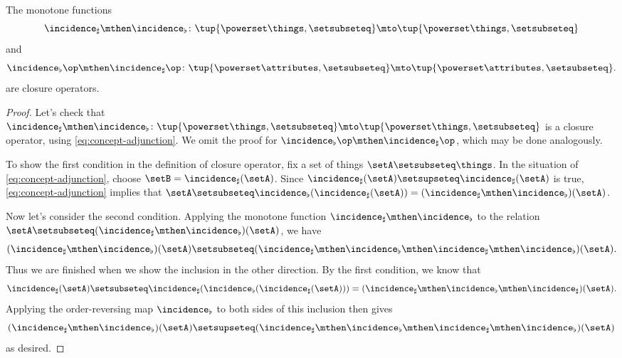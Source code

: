 \begin{lemma}\label{lem:cfa-closure-operators}
    The monotone functions
    \begin{equation}
        \incidence_\sharp \mthen \incidence_\flat \colon \tup{\powerset \things, \setsubseteq} \mto \tup{\powerset \things, \setsubseteq}
    \end{equation}
    and
    \begin{equation}
        \incidence_\flat\op \mthen \incidence_\sharp\op \colon \tup{\powerset \attributes, \setsubseteq} \mto \tup{\powerset \attributes, \setsubseteq}.
    \end{equation}
    are closure operators.
\end{lemma}

\begin{proof}
    Let's check that $\incidence_\sharp \mthen \incidence_\flat \colon \tup{\powerset \things, \setsubseteq} \mto \tup{\powerset \things, \setsubseteq}$ is a closure operator, using \cref{eq:concept-adjunction}.
    We omit the proof for $\incidence_\flat\op \mthen \incidence_\sharp\op$, which may be done analogously.

    To show the first condition in the definition of closure operator, fix a set of things $\setA \setsubseteq \things$.
    In the situation of \cref{eq:concept-adjunction}, choose $\setB = \incidence_\sharp(\setA)$.
    Since $\incidence_\sharp(\setA) \setsupseteq \incidence_\sharp(\setA)$ is true, \cref{eq:concept-adjunction} implies that $\setA \setsubseteq \incidence_\flat(\incidence_\sharp(\setA)) = (\incidence_\sharp \mthen \incidence_\flat)(\setA)$.

    Now let's consider the second condition.
    Applying the monotone function $\incidence_\sharp \mthen \incidence_\flat$ to the relation $\setA \setsubseteq (\incidence_\sharp \mthen \incidence_\flat)(\setA)$, we have
    \begin{equation}
        (\incidence_\sharp \mthen \incidence_\flat)(\setA) \setsubseteq (\incidence_\sharp \mthen \incidence_\flat \mthen \incidence_\sharp \mthen \incidence_\flat)(\setA).
    \end{equation}
    Thus we are finished when we show the inclusion in the other direction.
    By the first condition, we know that
    \begin{equation}
        \incidence_\sharp(\setA) \setsubseteq \incidence_\sharp( \incidence_\flat (\incidence_\sharp(\setA))) = (\incidence_\sharp \mthen \incidence_\flat \mthen \incidence_\sharp)(\setA).
    \end{equation}
    Applying the order-reversing map $\incidence_\flat$ to both sides of this inclusion then gives
    \begin{equation}
        (\incidence_\sharp \mthen \incidence_\flat)(\setA) \setsupseteq (\incidence_\sharp \mthen \incidence_\flat \mthen \incidence_\sharp \mthen \incidence_\flat)(\setA)
    \end{equation}
    as desired.
\end{proof}

